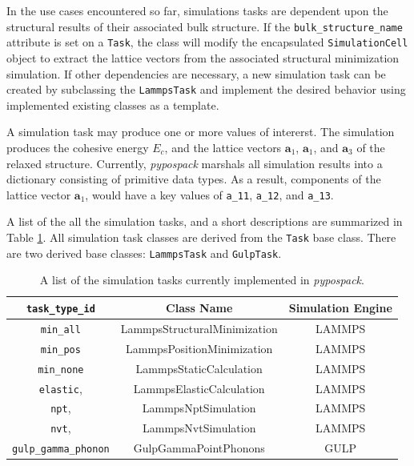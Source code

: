In the use cases encountered so far, simulations tasks are dependent upon the structural results of their associated bulk structure.  If the \verb|bulk_structure_name| attribute is set on a \verb|Task|, the class will modify the encapsulated \verb|SimulationCell| object to extract the lattice vectors from the associated structural minimization simulation.  If other dependencies are necessary, a new simulation task can be created by subclassing the \verb|LammpsTask| and implement the desired behavior using implemented existing classes as a template.

A simulation task may produce one or more values of intererst.  The simulation produces the cohesive energy $E_c$, and the lattice vectors $\bm{a}_1$, $\bm{a}_1$, and $\bm{a}_3$ of the relaxed structure.  Currently, \emph{pypospack} marshals all simulation results into a dictionary consisting of primitive data types.  As a result, components of the lattice vector $\bm{a}_1$, would have a key values of \verb|a_11|, \verb|a_12|, and \verb|a_13|.

A list of the all the simulation tasks, and a short descriptions are summarized in Table \ref{tbl:pypospack_tasks}.  All simulation task classes are derived from the  \verb|Task| base class. There are two derived base classes: \verb|LammpsTask| and \verb|GulpTask|.

\begin{table}[ht]
	\centering
	\caption{A list of the simulation tasks currently implemented in \emph{pypospack}.}
	\label{tbl:pypospack_tasks}
	\begin{tabular}{ccc}
		\hline
		\verb|task_type_id|
		& Class Name
		& Simulation Engine \\
		\hline
    \verb|min_all|
		& LammpsStructuralMinimization
		& LAMMPS
		\\
		\verb|min_pos|
		& LammpsPositionMinimization
    & LAMMPS
		\\
		\verb|min_none|
		& LammpsStaticCalculation
    & LAMMPS
		\\
		\verb|elastic|,
		& LammpsElasticCalculation
		& LAMMPS
		\\
    \verb|npt|,
		& LammpsNptSimulation
		& LAMMPS
		\\
		\verb|nvt|,
		& LammpsNvtSimulation
		& LAMMPS
		\\
    \verb|gulp_gamma_phonon|
		& GulpGammaPointPhonons
		& GULP
		\\
		\hline
	\end{tabular}
\end{table}

